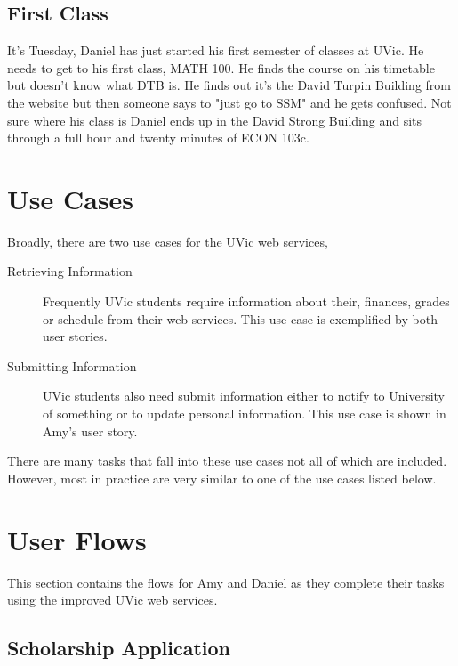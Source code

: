 \documentclass{article}
\begin{document}
\subsection{First Class}

It's Tuesday, Daniel has just started his first semester of classes at UVic. He needs to get to his first class, MATH 100. He finds the course on his timetable but doesn't know what DTB is. He finds out it's the David Turpin Building from the website but then someone says to "just go to SSM" and he gets confused. Not sure where his class is Daniel ends up in the David Strong Building and sits through a full hour and twenty minutes of ECON 103c.


\section{Use Cases}

Broadly, there are two use cases for the UVic web services,

\begin{description}
  \item[Retrieving Information] Frequently UVic students require information about their, finances, grades or schedule from their web services. This use case is exemplified by both user stories.
  \item[Submitting Information] UVic students also need submit information either to notify to University of something or to update personal information. This use case is shown in Amy's user story.
\end{description}

There are many tasks that fall into these use cases not all of which are included. However, most in practice are very similar to one of the use cases listed below.

\section{User Flows}

This section contains the flows for Amy and Daniel as they complete their tasks using the improved UVic web services.

\subsection{Scholarship Application}
\end{document}
